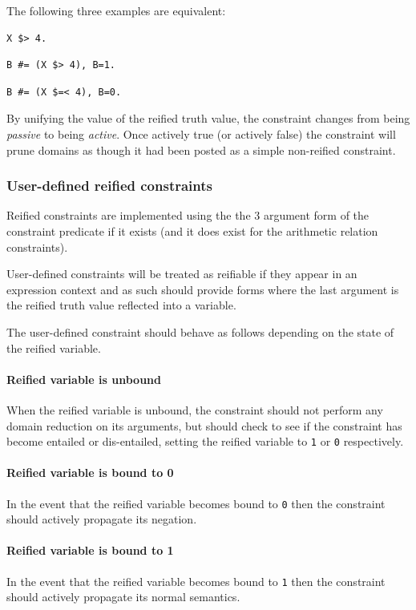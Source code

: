 The following three examples are equivalent:

\begin{verbatim}
X $> 4.
\end{verbatim}

\begin{verbatim}
B #= (X $> 4), B=1.
\end{verbatim}

\begin{verbatim}
B #= (X $=< 4), B=0.
\end{verbatim}

By unifying the value of the reified truth value, the constraint
changes from being {\em passive} to being {\em active}.  Once actively
true (or actively false) the constraint will prune domains as though
it had been posted as a simple non-reified constraint.

\subsubsection{User-defined reified constraints}
Reified constraints are implemented using the the 3 argument form of
the constraint predicate if it exists (and it does exist for the
arithmetic relation constraints).

User-defined constraints will be treated as reifiable if they appear in an
expression context and as such should provide forms where the last argument
is the reified truth value reflected into a variable.

The user-defined constraint should behave as follows depending on the
state of the reified variable.

\paragraph{Reified variable is unbound} When the reified variable is
unbound, the constraint should not perform any domain reduction on its
arguments, but should check to see if the constraint has become entailed or
dis-entailed, setting the reified variable to \verb|1| or \verb|0|
respectively.

\paragraph{Reified variable is bound to 0} In the event that the reified
variable becomes bound to \verb|0| then the constraint should actively
propagate its negation.

\paragraph{Reified variable is bound to 1} In the event that the reified
variable becomes bound to \verb|1| then the constraint should actively
propagate its normal semantics.

